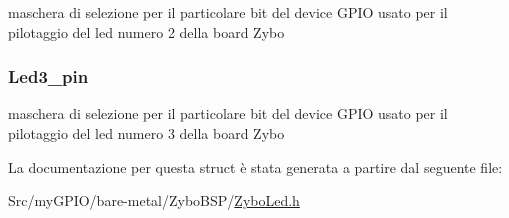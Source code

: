 maschera di selezione per il particolare bit del device G\+P\+I\+O usato per il pilotaggio del led numero 2 della board Zybo \hypertarget{struct_zybo_led__t_afc64d1407f30615e374bf9f06721842a}{
\subsubsection[{Led3\+\_\+pin}]{ Led3\+\_\+pin}}\label{struct_zybo_led__t_afc64d1407f30615e374bf9f06721842a}
maschera di selezione per il particolare bit del device G\+P\+I\+O usato per il pilotaggio del led numero 3 della board Zybo 

La documentazione per questa struct è stata generata a partire dal seguente file\+:\begin{DoxyCompactItemize}
\item 
Src/my\+G\+P\+I\+O/bare-\/metal/\+Zybo\+B\+S\+P/\hyperlink{_zybo_led_8h}{Zybo\+Led.\+h}\end{DoxyCompactItemize}
